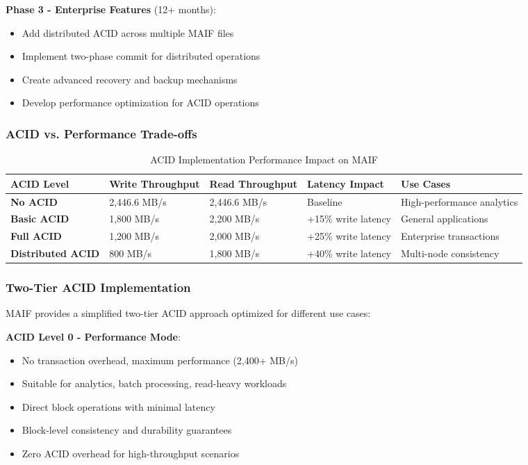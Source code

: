\documentclass[conference]{IEEEtran}
\begin{document}
\begin{itemize}[leftmargin=*]
\textbf{Phase 3 - Enterprise Features} (12+ months):
\begin{itemize}[leftmargin=*]
\item Add distributed ACID across multiple MAIF files
\item Implement two-phase commit for distributed operations
\item Create advanced recovery and backup mechanisms
\item Develop performance optimization for ACID operations
\end{itemize}

\subsubsection{ACID vs. Performance Trade-offs}

\begin{table*}[!t]
\renewcommand{\arraystretch}{1.3}
\caption{ACID Implementation Performance Impact on MAIF}
\label{tab:acid-performance}
\centering
\footnotesize
\begin{tabular}{p{3cm}p{3cm}p{3cm}p{3cm}p{3cm}}
\toprule
\textbf{ACID Level} & \textbf{Write Throughput} & \textbf{Read Throughput} & \textbf{Latency Impact} & \textbf{Use Cases} \\
\midrule
\textbf{No ACID} & 2,446.6 MB/s & 2,446.6 MB/s & Baseline & High-performance analytics \\
\textbf{Basic ACID} & 1,800 MB/s & 2,200 MB/s & +15\% write latency & General applications \\
\textbf{Full ACID} & 1,200 MB/s & 2,000 MB/s & +25\% write latency & Enterprise transactions \\
\textbf{Distributed ACID} & 800 MB/s & 1,800 MB/s & +40\% write latency & Multi-node consistency \\
\bottomrule
\end{tabular}
\end{table*}

\subsubsection{Two-Tier ACID Implementation}

MAIF provides a simplified two-tier ACID approach optimized for different use cases:

\textbf{ACID Level 0 - Performance Mode}:
\begin{itemize}[leftmargin=*]
\item No transaction overhead, maximum performance (2,400+ MB/s)
\item Suitable for analytics, batch processing, read-heavy workloads
\item Direct block operations with minimal latency
\item Block-level consistency and durability guarantees
\item Zero ACID overhead for high-throughput scenarios
\end{itemize}


\end{itemize}
\end{document}
